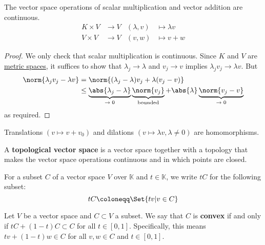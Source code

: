 \documentclass{article}
\newcommand{\K}{\mathbb{K}}
\begin{document}
\begin{fact}
    The vector space operations of scalar multiplication and vector addition are continuous.
    \begin{align*}
        K \times V &\to V & (\lambda, v) &\mapsto \lambda v \\
        V \times V &\to V & (v, w) &\mapsto v + w
    \end{align*}
\end{fact}

\begin{proof}
    We only check that scalar multiplication is continuous. Since $K$ and $V$ are \hyperlink{def:metric-on-vector-space}{metric spaces}, it suffices to show that $\lambda_j \to \lambda$ and $v_j \to v$ implies $\lambda_j v_j \to \lambda v$. But
    \begin{align*}
        \norm{\lambda_j v_j - \lambda v} &= \norm{(\lambda_j - \lambda) v_j + \lambda(v_j - v)} \\
                                         &\leq \underbrace{\abs{\lambda_j - \lambda}}_\text{$\to 0$} \underbrace{\norm{v_j}}_\text{bounded} + \abs{\lambda} \underbrace{\norm{v_j - v}}_\text{$\to 0$}
    \end{align*}
    as required.
\end{proof}

\begin{cor}
    Translations $(v \mapsto v + v_0)$ and dilations $(v \mapsto \lambda v, \lambda \ne 0)$ are homomorphisms.
\end{cor}

\begin{defi}
    A \textbf{topological vector space} is a vector space together with a topology that makes the vector space operations continuous and in which points are closed.
\end{defi}

\begin{notation}
    For a subset $C$ of a vector space $V$ over $\K$ and $t \in \K$, we write $t C$ for the following subset:
    \begin{equation*}
        t C \coloneqq \Set{t v | v \in C}
    \end{equation*}
\end{notation}

\begin{defi}
    Let $V$ be a vector space and $C \subset V$ a subset.  We say that $C$ is \textbf{convex} if and only if $t C + (1-t) C \subset C$ for all $t \in [0, 1]$. Specifically, this means $t v + (1-t) w \in C$ for all $v, w \in C$ and $t \in [0, 1]$.
\end{defi}
\end{document}
